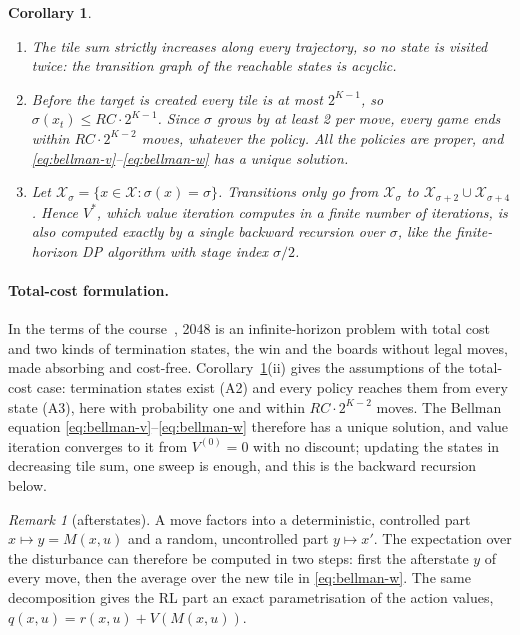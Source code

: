 \documentclass[11pt,a4paper]{article}
\newtheorem{corollary}{Corollary}
\theoremstyle{remark}
\newtheorem*{remark}{Remark}
\newcommand{\X}{\mathcal{X}}
\begin{document}
\begin{corollary}\label{cor:dag}
\begin{enumerate}[label=(\roman*)]
\item The tile sum strictly increases along every trajectory, so no state is visited twice: the transition graph of the reachable states is acyclic.
\item Before the target is created every tile is at most $2^{K-1}$, so $\sigma(x_t)\le RC\cdot 2^{K-1}$. Since $\sigma$ grows by at least 2 per move, every game ends within $RC\cdot 2^{K-2}$ moves, whatever the policy. All the policies are proper, and \eqref{eq:bellman-v}--\eqref{eq:bellman-w} has a unique solution.
\item Let $\X_\sigma=\{x\in\X:\sigma(x)=\sigma\}$. Transitions only go from $\X_\sigma$ to $\X_{\sigma+2}\cup\X_{\sigma+4}$. Hence $V^*$, which value iteration computes in a finite number of iterations, is also computed exactly by a single backward recursion over $\sigma$, like the finite-horizon DP algorithm with stage index $\sigma/2$.
\end{enumerate}
\end{corollary}

\paragraph{Total-cost formulation.} In the terms of the course~\cite{bertsekas}, 2048 is an infinite-horizon problem with total cost and two kinds of termination states, the win and the boards without legal moves, made absorbing and cost-free. Corollary~\ref{cor:dag}(ii) gives the assumptions of the total-cost case: termination states exist (A2) and every policy reaches them from every state (A3), here with probability one and within $RC\cdot2^{K-2}$ moves. The Bellman equation \eqref{eq:bellman-v}--\eqref{eq:bellman-w} therefore has a unique solution, and value iteration converges to it from $V^{(0)}=0$ with no discount; updating the states in decreasing tile sum, one sweep is enough, and this is the backward recursion below.

\begin{remark}[afterstates]
A move factors into a deterministic, controlled part $x\mapsto y=M(x,u)$ and a random, uncontrolled part $y\mapsto x'$. The expectation over the disturbance can therefore be computed in two steps: first the afterstate $y$ of every move, then the average over the new tile in \eqref{eq:bellman-w}. The same decomposition gives the RL part an exact parametrisation of the action values, $q(x,u)=r(x,u)+V(M(x,u))$.
\end{remark}
\end{document}
